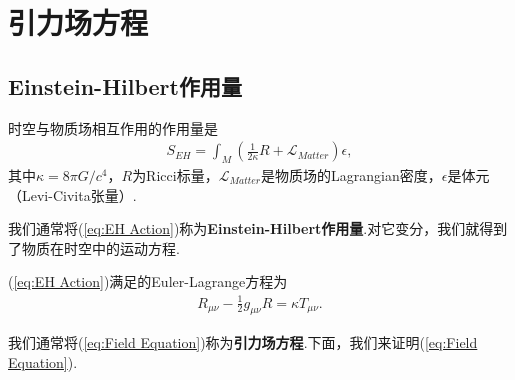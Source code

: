 \section{引力场方程}\label{sec:Field equation}

    \subsection{Einstein-Hilbert作用量}
        \begin{definition}
            时空与物质场相互作用的作用量是
            \begin{eqnarray}\label{eq:EH Action}
                S_{EH}=\int_M\left(\frac{1}{2\kappa}R+\mathcal{L} _{Matter}\right)\epsilon,
            \end{eqnarray}
            其中$\kappa=8\pi G/c^4$，$R$为Ricci标量，$\mathcal{L} _{Matter}$是物质场的Lagrangian密度，$\epsilon$是体元（Levi-Civita张量）.
        \end{definition}
        我们通常将(\ref{eq:EH Action})称为\textbf{Einstein-Hilbert作用量}.对它变分，我们就得到了物质在时空中的运动方程.
        \begin{theorem}
            (\ref{eq:EH Action})满足的Euler-Lagrange方程为
            \begin{eqnarray}\label{eq:Field Equation}
                R_{\mu\nu}-\frac{1}{2}g_{\mu\nu}R=\kappa T_{\mu\nu}.
            \end{eqnarray}
        \end{theorem}
        我们通常将(\ref{eq:Field Equation})称为\textbf{引力场方程}.下面，我们来证明(\ref{eq:Field Equation}).
